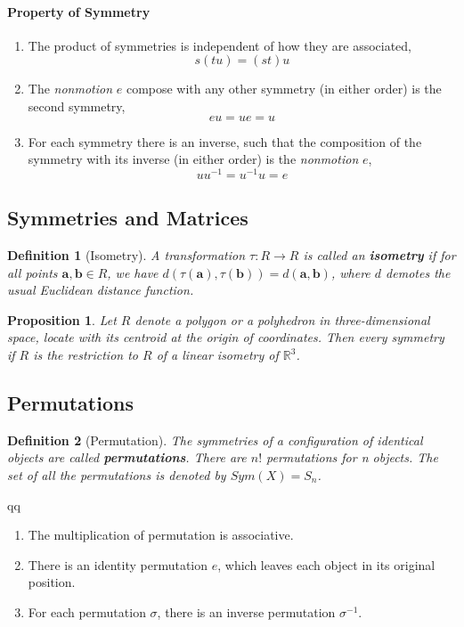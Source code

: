 \documentclass[12pt]{article}
\newtheorem{definition}{Definition}[subsection]
\newtheorem{proposition}{Proposition}[subsection]
\begin{document}
\paragraph{Property of Symmetry}
\begin{enumerate}
    \item The product of symmetries is independent of how they are associated,
        \[
            s(tu) = (st)u
        \]

    \item  The \textit{nonmotion} $e$ compose with any other symmetry (in either order) is the second symmetry,
        \[
            eu = ue = u
        \]
    \item For each symmetry there is an inverse, such that the composition of the symmetry with its inverse (in either order) is the \textit{nonmotion} $e$,
        \[
            uu^{-1} = u^{-1}u = e
        \]
\end{enumerate}

\subsection{Symmetries and Matrices}
    \begin{definition}[Isometry]
        A transformation $\tau : R \rightarrow R$ is called an \textbf{isometry} if for all points $\mathbf {a, b} \in R$, we have $d(\tau(\mathbf a), \tau(\mathbf b)) =  d(\mathbf {a, b})$, where $d$ demotes the usual Euclidean distance function.
    \end{definition}

    \begin{proposition}
        Let $R$ denote a polygon or a polyhedron in three-dimensional space, locate with its centroid at the origin of coordinates. Then every symmetry if $R$ is the restriction to $R$ of a linear isometry of $\mathbb{R}^3$.
    \end{proposition}

\subsection{Permutations}
    \begin{definition}[Permutation]
        The symmetries of a configuration of identical objects are called \textbf{permutations}. There are $n!$ permutations for n objects. The set of all the permutations is denoted by $Sym(X) = S_n$.
    \end{definition}

                                                                                                                                                                                                                                                                    qq
\begin{enumerate}
    \item The multiplication of permutation is associative.
    \item There is an identity permutation $e$, which leaves each object in its original position.
    \item For each permutation $\sigma$, there is an inverse permutation $\sigma^{-1}$.
\end{enumerate}
\end{document}
